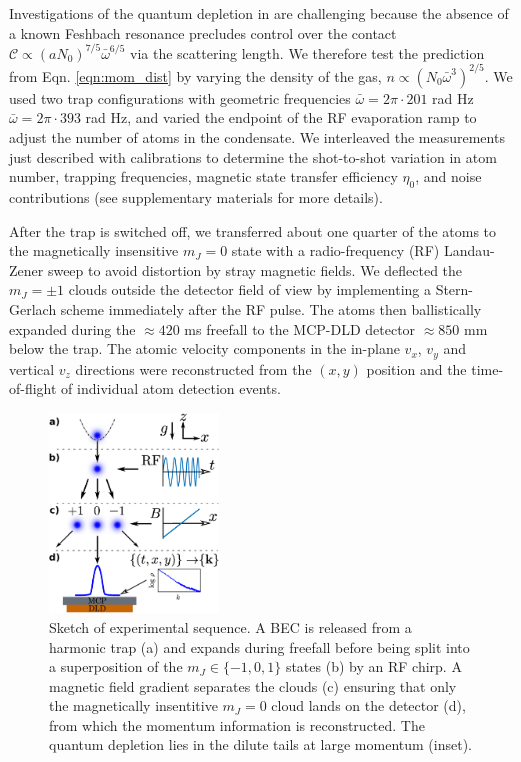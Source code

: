 Investigations of the quantum depletion in \mhe are challenging because the absence of a known Feshbach resonance precludes control over the contact $\mathcal{C}\propto(a N_0)^{7/5}\bar{\omega}^{6/5}$ via the scattering length. We therefore test the prediction from Eqn. \ref{eqn:mom_dist} by varying the density of the gas, $n\propto\left(N_{0}\bar{\omega}^3\right)^{2/5}$. We used two trap configurations with geometric frequencies $\bar{\omega} = 2\pi \cdot201$ rad Hz $\bar{\omega} = 2\pi \cdot393$ rad Hz, and varied the endpoint of the RF evaporation ramp to adjust the number of atoms in the condensate. We interleaved the measurements just described with calibrations to determine the shot-to-shot variation in atom number, trapping frequencies, magnetic state transfer efficiency $\eta_0$, and noise contributions (see supplementary materials \cite{SOM} for more details).

After the trap is switched off, we transferred about one quarter of the atoms to the magnetically insensitive $m_J=0$ state with a radio-frequency (RF) Landau-Zener sweep to avoid distortion by stray magnetic fields. We deflected the $m_J=\pm 1$ clouds outside the detector field of view by implementing a Stern-Gerlach scheme immediately after the RF pulse. The atoms then ballistically expanded during the $\approx420$ ms freefall to the MCP-DLD detector $\approx850$ mm below the trap. The atomic velocity components in the in-plane $v_x$, $v_y$ and vertical $v_z$ directions were reconstructed from the $(x,y)$ position and the time-of-flight of individual atom detection events. 


\begin{figure}[b]
    \includegraphics[width=0.4\textwidth]{fig/QD/exp_cartoon}
    \caption{Sketch of experimental sequence. A BEC is released from a harmonic trap (a) and expands during freefall before being split into a superposition of the $m_J\in\{-1,0,1\}$ states (b) by an RF chirp. A magnetic field gradient separates the clouds (c) ensuring that only the magnetically insentitive $m_J=0$ cloud lands on the detector (d), from which the momentum information is reconstructed. The quantum depletion lies in the dilute tails at large momentum (inset).}
    \label{fig:sequence}
\end{figure}


